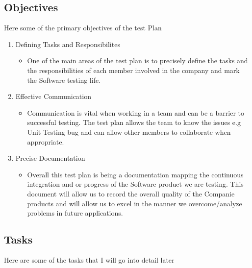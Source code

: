 \subsection{Objectives}
Here some of the primary  objectives of the test Plan
\begin{enumerate}
 
  
	\item Defining Tasks and Responsibilites 
   \begin{itemize}
     \item One of the main areas of the test plan is to precisely define the tasks and the responsibilities of each member involved in the company and mark the Software testing life.
   \end{itemize}


\item Effective Communication 
   \begin{itemize}
     \item Communication is vital when working in a team and can be a barrier to successful testing. The test plan allows the team to know the issues e.g Unit Testing bug and can allow other members to collaborate when appropriate.
   \end{itemize}


\item Precise Documentation 
   \begin{itemize}
     \item Overall this test plan is being a documentation mapping the continuous integration and or progress of the Software product we are testing. This document will allow us to record the overall quality of the Companie products and will allow us to excel in the manner we overcome/analyze problems in future applications. 
   \end{itemize}


   
\end{enumerate}


\subsection{Tasks}
Here are some of the tasks that I will go into detail later


